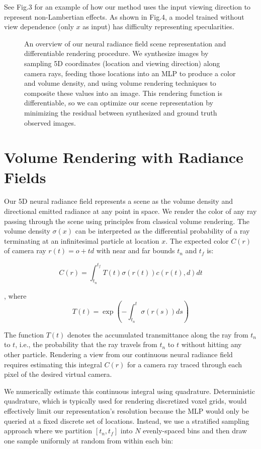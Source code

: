 \documentclass[12pt]{article}
\begin{document}
See Fig.3 for an example of how our method uses the input viewing direction to represent non-Lambertian effects.
As shown in Fig.4, a model trained without view dependence (only $x$ as input) has difficulty representing specularities.

\begin{figure}
\caption{An overview of our neural radiance field scene representation and differentiable rendering procedure. 
We synthesize images by sampling 5D coordinates (location and viewing direction) along camera rays, feeding those locations into an MLP to produce a color and volume density,
and using volume rendering techniques to composite these values into an image. This rendering function is differentiable, so we can optimize our scene representation
by minimizing the residual between synthesized and ground truth observed images.}
\end{figure}

\section{Volume Rendering with Radiance Fields}
Our 5D neural radiance field represents a scene as the volume density 
and directional emitted radiance at any point in space. We render the color of any ray passing through the scene using principles from classical volume rendering.
The volume density $\sigma(x)$ can be interpreted as the differential probability of a ray terminating at an infinitesimal particle at location $x$. The expected color 
$C(r)$ of camera ray $r(t) = o+td$ with near and far bounds $t_n$ and $t_f$ is:

\begin{equation}
    C(r) = \int_{t_n}^{t_f} T(t) \sigma(r(t)) c(r(t),d)dt
\end{equation}

, where
\begin{equation}
    T(t) = \exp (- \int_{t_n}^{t} \sigma(r(s))ds)
\end{equation}

The function $T(t)$ denotes the accumulated transmittance along the ray from $t_n$ to $t$, i.e.,
the probability that the ray travels from $t_n$ to $t$ without hitting any other particle. 
Rendering a view from our continuous neural radiance field requires estimating this integral $C(r)$ for a camera ray traced through each pixel
of the desired virtual camera. 

We numerically estimate this continuous integral using quadrature. Deterministic quadrature, which is typically used for rendering discretized voxel grids, 
would effectively limit our representation's resolution because the MLP would only be queried at a fixed discrete set of locations. 
Instead, we use a stratified sampling approach where we partition $[t_n, t_f]$ into $N$ evenly-spaced bins and then draw one sample uniformly at random from within
each bin:
\end{document}
